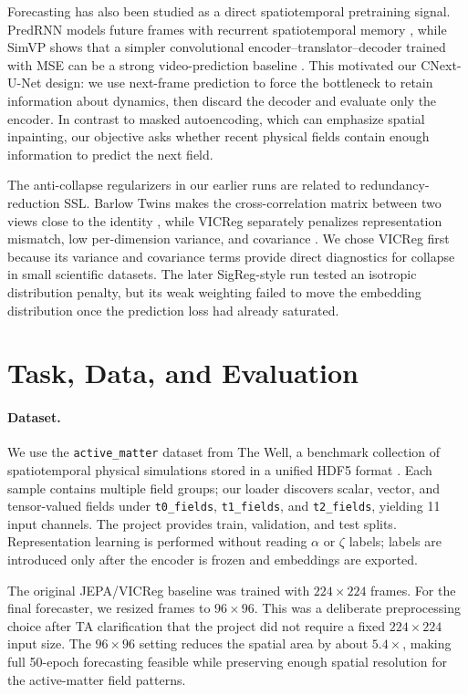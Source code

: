 \documentclass{article}
\begin{document}
Forecasting has also been studied as a direct spatiotemporal pretraining signal. PredRNN models future frames with recurrent spatiotemporal memory \citep{wang2017predrnn}, while SimVP shows that a simpler convolutional encoder--translator--decoder trained with MSE can be a strong video-prediction baseline \citep{gao2022simvp}. This motivated our CNext-U-Net design: we use next-frame prediction to force the bottleneck to retain information about dynamics, then discard the decoder and evaluate only the encoder. In contrast to masked autoencoding, which can emphasize spatial inpainting, our objective asks whether recent physical fields contain enough information to predict the next field.

The anti-collapse regularizers in our earlier runs are related to redundancy-reduction SSL. Barlow Twins makes the cross-correlation matrix between two views close to the identity \citep{zbontar2021barlow}, while VICReg separately penalizes representation mismatch, low per-dimension variance, and covariance \citep{bardes2021vicreg}. We chose VICReg first because its variance and covariance terms provide direct diagnostics for collapse in small scientific datasets. The later SigReg-style run tested an isotropic distribution penalty, but its weak weighting failed to move the embedding distribution once the prediction loss had already saturated.

\section{Task, Data, and Evaluation}

\paragraph{Dataset.}
We use the \texttt{active\_matter} dataset from The Well, a benchmark collection of spatiotemporal physical simulations stored in a unified HDF5 format \citep{ohana2024well}. Each sample contains multiple field groups; our loader discovers scalar, vector, and tensor-valued fields under \texttt{t0\_fields}, \texttt{t1\_fields}, and \texttt{t2\_fields}, yielding 11 input channels. The project provides train, validation, and test splits. Representation learning is performed without reading $\alpha$ or $\zeta$ labels; labels are introduced only after the encoder is frozen and embeddings are exported.

The original JEPA/VICReg baseline was trained with $224\times224$ frames. For the final forecaster, we resized frames to $96\times96$. This was a deliberate preprocessing choice after TA clarification that the project did not require a fixed $224\times224$ input size. The $96\times96$ setting reduces the spatial area by about $5.4\times$, making full 50-epoch forecasting feasible while preserving enough spatial resolution for the active-matter field patterns.
\end{document}
